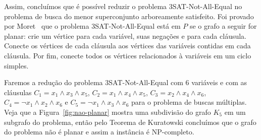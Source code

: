 Assim, concluímos que é possível reduzir o problema 3SAT-Not-All-Equal no problema de busca do menor superconjunto arboreamente satisfeito. Foi provado por Moret~\cite{buscas} que o problema 3SAT-Not-All-Equal está em $P$ se o grafo a seguir for planar: crie um vértice para cada variável, suas negações e para cada cláusula. Conecte os vértices de cada cláusula aos vértices das variáveis contidas em cada cláusula. Por fim, conecte todos os vértices relacionados à variáveis em um ciclo simples.

Faremos a redução do problema 3SAT-Not-All-Equal com 6 variáveis e com as cláusulas $C_1 = x_1 \land x_3 \land x_5$, $C_2 = x_1 \land x_4 \land x_5$, $C_3 = x_2 \land x_4 \land x_6$, $C_4 = \neg x_1 \land x_2 \land x_6$ e $C_5 = \neg x_1 \land x_3 \land x_6$ para o problema de buscas múltiplas. Veja que a Figura~\ref{fig:nao-planar} mostra uma subdivisão do grafo $K_5$ em um subgrafo do problema, então pelo Teorema de Kuratowski concluímos que o grafo do problema não é planar e assim a instância é NP-completo.

